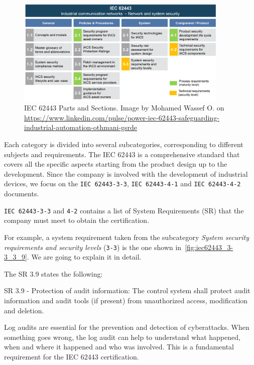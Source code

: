\begin{figure}[ht]
  \centering
  \includegraphics[width=0.9\textwidth]{chapters/04/assets/iec62443.png}
  \caption[IEC 62443 Parts and Sections. Image by Mohamed Wassef O.]{IEC 62443 Parts and Sections. Image by Mohamed Wassef O. on \url{https://www.linkedin.com/pulse/power-iec-62443-safeguarding-industrial-automation-othmani-gsrde}}
  \label{fig:iec-62443}
\end{figure}

Each category is divided into several subcategories, corresponding to different subjects and requirements. The IEC 62443 is a comprehensive standard that covers all the specific aspects starting from the product design up to the development. Since the company is involved with the development of industrial devices, we focus on the \texttt{IEC 62443-3-3}, \texttt{IEC 62443-4-1} and \texttt{IEC 62443-4-2} documents.

\texttt{IEC 62443-3-3} and \texttt{4-2} contains a list of System Requirements (SR) that the company must meet to obtain the certification.

For example, a system requirement taken from the subcategory \textit{System security requirements and security levels} (\texttt{3-3}) is the one shown in~\cref{fig:iec62443_3-3_3_9}. We are going to explain it in detail.

The SR 3.9 states the following:
\begin{mdframed}
  SR 3.9 - Protection of audit information: The control system shall protect audit information and audit tools (if present) from unauthorized access, modification and deletion.
\end{mdframed}\label{sr:3-3_3-9}

Log audits are essential for the prevention and detection of cyberattacks. When something goes wrong, the log audit can help to understand what happened, when and where it happened and who was involved. This is a fundamental requirement for the IEC 62443 certification.

